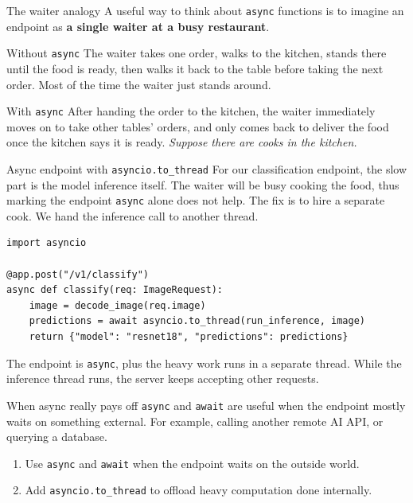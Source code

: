 \documentclass[aspectratio=169]{beamer}
\begin{document}
\begin{frame}{The waiter analogy}
A useful way to think about \texttt{async} functions is to imagine an endpoint as \textbf{a single waiter at a busy restaurant}.

    \begin{block}{Without \texttt{async}}
        The waiter takes one order, walks to the kitchen, stands there until the food is ready, then walks it back to the table before taking the next order.
        Most of the time the waiter just stands around.
    \end{block}

    \begin{block}{With \texttt{async}}
After handing the order to the kitchen, the waiter immediately moves on to take other tables' orders, and only comes back to deliver the food once the kitchen says it is ready. \textit{Suppose there are cooks in the kitchen.}
    \end{block}
\end{frame}

\begin{frame}[fragile]{Async endpoint with \texttt{asyncio.to\_thread}}
    For our classification endpoint, the slow part is the model inference itself.
    The waiter will be busy cooking the food, thus marking the endpoint \texttt{async} alone does not help.
    The fix is to hire a separate cook. We hand the inference call to another thread.

    \begin{verbatim}
import asyncio

@app.post("/v1/classify")
async def classify(req: ImageRequest):
    image = decode_image(req.image)
    predictions = await asyncio.to_thread(run_inference, image)
    return {"model": "resnet18", "predictions": predictions}
    \end{verbatim}

The endpoint is \texttt{async}, plus the heavy work runs in a separate thread.
While the inference thread runs, the server keeps accepting other requests.
\end{frame}

\begin{frame}{When async really pays off}
    \texttt{async} and \texttt{await} are useful when the endpoint mostly waits on something external.
For example, calling another remote AI API, or querying a database.

\begin{enumerate}
\item Use \texttt{async} and \texttt{await} when the endpoint waits on the outside world.
\item Add \texttt{asyncio.to\_thread} to offload heavy computation done internally.
\end{enumerate}
\end{frame}
\end{document}
